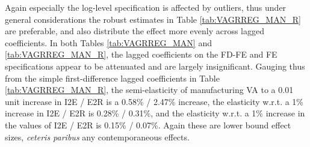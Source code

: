 \documentclass[a4paper]{article}
\begin{document}

Again especially the log-level specification is affected by outliers, thus under general considerations the robust estimates in Table \ref{tab:VAGRREG_MAN_R} are preferable, and also distribute the effect more evenly across lagged coefficients. In both Tables \ref{tab:VAGRREG_MAN} and \ref{tab:VAGRREG_MAN_R}, the lagged coefficients on the FD-FE and FE specifications appear to be attenuated and are largely insignificant. Gauging thus from the simple first-difference lagged coefficients in  Table \ref{tab:VAGRREG_MAN_R}, the semi-elasticity of manufacturing VA to a 0.01 unit increase in I2E / E2R is a 0.58\% / 2.47\% increase, the elasticity w.r.t. a 1\% increase in I2E / E2R is 0.28\% / 0.31\%, and the elasticity w.r.t. a 1\% increase in the values of I2E / E2R is 0.15\% / 0.07\%. Again these are lower bound effect sizes, \textit{ceteris paribus} any contemporaneous effects. \newline



\end{document}
